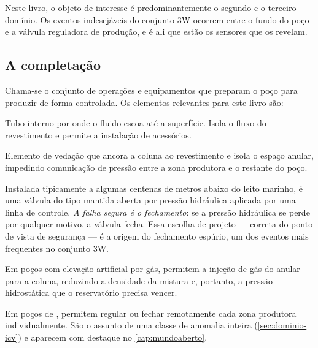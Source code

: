 Neste livro, o objeto de interesse é predominantemente o segundo e o terceiro domínio.
Os eventos indesejáveis do conjunto 3W ocorrem entre o fundo do poço e a válvula
reguladora de produção, e é ali que estão os sensores que os revelam.

\subsection{A completação}

Chama-se  o conjunto de operações e equipamentos
que preparam o poço para produzir de forma controlada. Os elementos relevantes para
este livro são:

\begin{description}[leftmargin=0pt,style=nextline,itemsep=0.5em]

\item[Coluna de produção.] Tubo interno por onde o fluido escoa até a superfície. Isola
o fluxo do revestimento e permite a instalação de acessórios.

\item[\ing{Packer}.] Elemento de vedação que ancora a coluna ao revestimento e isola o
espaço anular, impedindo comunicação de pressão entre a zona produtora e o restante do
poço.

\item[Válvula de segurança de subsuperfície (DHSV).] Instalada tipicamente a algumas
centenas de metros abaixo do leito marinho, é uma válvula do tipo 
mantida aberta por pressão hidráulica aplicada por uma linha de controle. \emph{A
falha segura é o fechamento}: se a pressão hidráulica se perde por qualquer motivo, a
válvula fecha. Essa escolha de projeto --- correta do ponto de vista de segurança ---
é a origem do fechamento espúrio, um dos eventos mais frequentes no conjunto 3W.

\item[Válvulas de gás de elevação (GLV).] Em poços com elevação artificial por gás,
permitem a injeção de gás do anular para a coluna, reduzindo a densidade da mistura e,
portanto, a pressão hidrostática que o reservatório precisa vencer.

\item[Válvulas de controle de intervalo (ICV).] Em poços de , permitem regular ou fechar remotamente cada zona
produtora individualmente. São o assunto de uma classe de anomalia inteira
(\cref{sec:dominio-icv}) e aparecem com destaque no \cref{cap:mundoaberto}.

\end{description}

